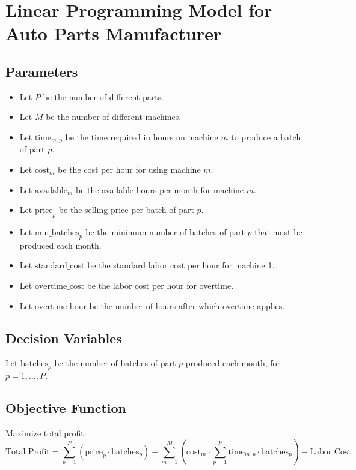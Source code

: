 \documentclass{article}
\begin{document}
\section*{Linear Programming Model for Auto Parts Manufacturer}

\subsection*{Parameters}
\begin{itemize}
    \item Let \( P \) be the number of different parts.
    \item Let \( M \) be the number of different machines.
    \item Let \( \text{time}_{m,p} \) be the time required in hours on machine \( m \) to produce a batch of part \( p \).
    \item Let \( \text{cost}_{m} \) be the cost per hour for using machine \( m \).
    \item Let \( \text{available}_{m} \) be the available hours per month for machine \( m \).
    \item Let \( \text{price}_{p} \) be the selling price per batch of part \( p \).
    \item Let \( \text{min\_batches}_{p} \) be the minimum number of batches of part \( p \) that must be produced each month.
    \item Let \( \text{standard\_cost} \) be the standard labor cost per hour for machine 1.
    \item Let \( \text{overtime\_cost} \) be the labor cost per hour for overtime.
    \item Let \( \text{overtime\_hour} \) be the number of hours after which overtime applies.
\end{itemize}

\subsection*{Decision Variables}
Let \( \text{batches}_{p} \) be the number of batches of part \( p \) produced each month, for \( p = 1, \ldots, P \).

\subsection*{Objective Function}
Maximize total profit:
\[
\text{Total Profit} = \sum_{p=1}^{P} \left( \text{price}_{p} \cdot \text{batches}_{p} \right) - \sum_{m=1}^{M} \left( \text{cost}_{m} \cdot \sum_{p=1}^{P} \text{time}_{m,p} \cdot \text{batches}_{p} \right) - \text{Labor Cost}
\]
\end{document}
